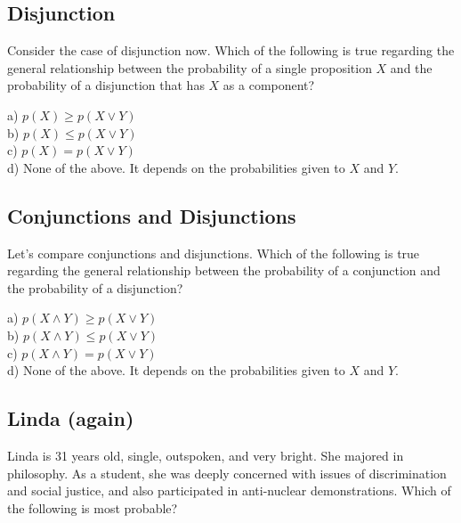 \documentclass[]{tufte-book}
\begin{document}
\hypertarget{disjunction}{%
\subsection{Disjunction}\label{disjunction}}

Consider the case of disjunction now. Which of the following is true regarding the general relationship between the probability of a single proposition \(X\) and the probability of a disjunction that has \(X\) as a component?

a) \(p(X)\geq p(X\vee Y)\)\\
\hspace*{0.333em}\hspace*{0.333em}b) \(p(X)\leq p(X\vee Y)\)\\
\hspace*{0.333em}\hspace*{0.333em}c) \(p(X) = p(X\vee Y)\)\\
\hspace*{0.333em}\hspace*{0.333em}d) None of the above. It depends on the probabilities given to \(X\) and \(Y\).

\hypertarget{conjunctions-and-disjunctions}{%
\subsection{Conjunctions and Disjunctions}\label{conjunctions-and-disjunctions}}

Let's compare conjunctions and disjunctions. Which of the following is true regarding the general relationship between the probability of a conjunction and the probability of a disjunction?

a) \(p(X\wedge Y)\geq p(X\vee Y)\)\\
b) \(p(X\wedge Y)\leq p(X\vee Y)\)\\
c) \(p(X\wedge Y) = p(X\vee Y)\)\\
d) None of the above. It depends on the probabilities given to \(X\) and \(Y\).

\hypertarget{linda-again}{%
\subsection{Linda (again)}\label{linda-again}}

Linda is 31 years old, single, outspoken, and very bright. She majored in philosophy. As a student, she was deeply concerned with issues of discrimination and social justice, and also participated in anti-nuclear demonstrations. Which of the following is most probable?
\end{document}
